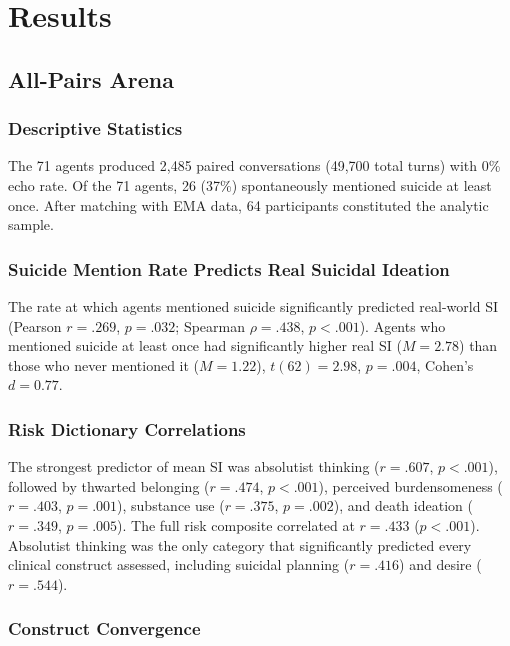 \documentclass[review,12pt,authoryear]{elsarticle}
\begin{document}
\section{Results}

\subsection{All-Pairs Arena}

\subsubsection{Descriptive Statistics}

The 71 agents produced 2,485 paired conversations (49,700 total turns) with 0\% echo rate. Of the 71 agents, 26 (37\%) spontaneously mentioned suicide at least once. After matching with EMA data, 64 participants constituted the analytic sample.

\subsubsection{Suicide Mention Rate Predicts Real Suicidal Ideation}

The rate at which agents mentioned suicide significantly predicted real-world SI (Pearson $r = .269$, $p = .032$; Spearman $\rho = .438$, $p < .001$). Agents who mentioned suicide at least once had significantly higher real SI ($M = 2.78$) than those who never mentioned it ($M = 1.22$), $t(62) = 2.98$, $p = .004$, Cohen's $d = 0.77$.

\subsubsection{Risk Dictionary Correlations}

The strongest predictor of mean SI was absolutist thinking ($r = .607$, $p < .001$), followed by thwarted belonging ($r = .474$, $p < .001$), perceived burdensomeness ($r = .403$, $p = .001$), substance use ($r = .375$, $p = .002$), and death ideation ($r = .349$, $p = .005$). The full risk composite correlated at $r = .433$ ($p < .001$). Absolutist thinking was the only category that significantly predicted every clinical construct assessed, including suicidal planning ($r = .416$) and desire ($r = .544$).

\subsubsection{Construct Convergence}
\end{document}
